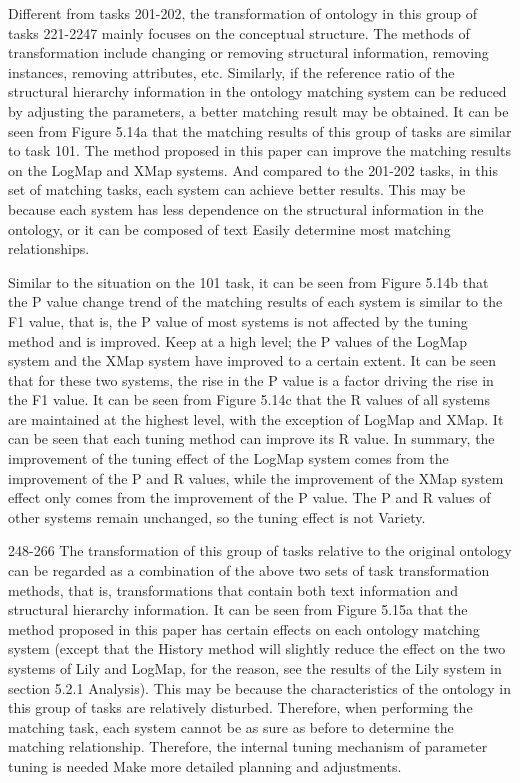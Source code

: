 \documentclass[twoside]{article}
\begin{document}
\begin{multicols}{2}
Different from tasks 201-202, the transformation of ontology in this group of tasks 221-2247 mainly focuses on the conceptual structure. The methods of transformation include changing or removing structural information, removing instances, removing attributes, etc. 
Similarly, if the reference ratio of the structural hierarchy information in the ontology matching system can be reduced by adjusting the parameters, a better matching result may be obtained. 
It can be seen from Figure 5.14a that the matching results of this group of tasks are similar to task 101. The method proposed in this paper can improve the matching results on the LogMap and XMap systems. 
And compared to the 201-202 tasks, in this set of matching tasks, each system can achieve better results. This may be because each system has less dependence on the structural information in the ontology, or it can be composed of text Easily determine most matching relationships.

Similar to the situation on the 101 task, it can be seen from Figure 5.14b that the P value change trend of the matching results of each system is similar to the F1 value, that is, the P value of most systems is not affected by the tuning method and is improved. Keep at a high level; the P values of the LogMap system and the XMap system have improved to a certain extent. It can be seen that for these two systems, the rise in the P value is a factor driving the rise in the F1 value. 
It can be seen from Figure 5.14c that the R values of all systems are maintained at the highest level, with the exception of LogMap and XMap. It can be seen that each tuning method can improve its R value. 
In summary, the improvement of the tuning effect of the LogMap system comes from the improvement of the P and R values, while the improvement of the XMap system effect only comes from the improvement of the P value. The P and R values of other systems remain unchanged, so the tuning effect is not Variety.

248-266 The transformation of this group of tasks relative to the original ontology can be regarded as a combination of the above two sets of task transformation methods, that is, transformations that contain both text information and structural hierarchy information. 
It can be seen from Figure 5.15a that the method proposed in this paper has certain effects on each ontology matching system (except that the History method will slightly reduce the effect on the two systems of Lily and LogMap, for the reason, see the results of the Lily system in section 5.2.1 Analysis). 
This may be because the characteristics of the ontology in this group of tasks are relatively disturbed. Therefore, when performing the matching task, each system cannot be as sure as before to determine the matching relationship. Therefore, the internal tuning mechanism of parameter tuning is needed Make more detailed planning and adjustments.


\end{multicols}
\end{document}
